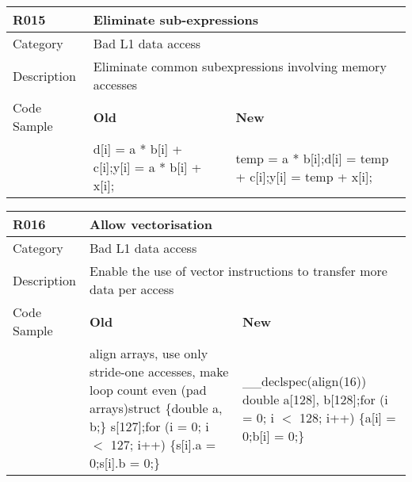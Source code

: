 \begin{tabular}{|p{0.9in}|p{2.0in}|p{2.0in}|} \hline
\textbf{R015}       & \multicolumn{2}{|p{4.0in}|}{\textbf{Eliminate sub-expressions}} \\ \hline
Category            & \multicolumn{2}{|p{4.0in}|}{Bad L1 data access} \\ \hline
Description         & \multicolumn{2}{|p{4.0in}|}{Eliminate common subexpressions involving memory accesses} \\ \hline
Code Sample         & \textbf{Old} & \textbf{New} \\ \hline
                    & d[i] = a * b[i] + c[i];\newline y[i] = a * b[i] + x[i];
                    & temp = a * b[i];\newline d[i] = temp + c[i];\newline y[i] = temp + x[i]; \\ \hline
\end{tabular}

\begin{tabular}{|p{0.9in}|p{2.0in}|p{2.0in}|} \hline
\textbf{R016}       & \multicolumn{2}{|p{4.0in}|}{\textbf{Allow vectorisation}} \\ \hline
Category            & \multicolumn{2}{|p{4.0in}|}{Bad L1 data access} \\ \hline
Description         & \multicolumn{2}{|p{4.0in}|}{Enable the use of vector instructions to transfer more data per access} \\ \hline
Code Sample         & \textbf{Old} & \textbf{New} \\ \hline
                    & align arrays, use only stride-one accesses, make loop count even (pad arrays)\newline struct \{\newline   double a, b;\newline \} s[127];\newline for (i = 0; i $<$ 127; i++) \{\newline   s[i].a = 0;\newline   s[i].b = 0;\newline \}
                    & \_\_declspec(align(16)) double a[128], b[128];\newline for (i = 0; i $<$ 128; i++) \{\newline   a[i] = 0;\newline   b[i] = 0;\newline \} \\ \hline
\end{tabular}

